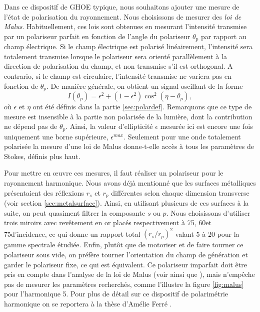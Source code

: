 Dans ce dispositif de GHOE typique, nous souhaitons ajouter une mesure de l'état de polarisation du rayonnement. Nous choisissons de mesurer des \textit{loi de Malus}. Habituellement, ces lois sont obtenues en mesurant l'intensité transmise par un polariseur parfait en fonction de l'angle du polariseur $\theta_p$ par rapport au champ électrique. Si le champ électrique est polarisé linéairement, l'intensité sera totalement transmise lorsque le polariseur sera orienté parallèlement à la direction de polarisation du champ, et non transmise s'il est orthogonal. A contrario, si le champ est circulaire, l'intensité transmise ne variera pas en fonction de $\theta_p$. De manière générale, on obtient un signal oscillant de la forme 
\begin{equation}
I(\theta_p) = \epsilon^2+(1-\epsilon^2)\cos^2(\eta-\theta_p),
\end{equation}
où $\epsilon$ et $\eta$ ont été définis dans la partie \ref{sec:polardef}. Remarquons que ce type de mesure est insensible à la partie non polarisée de la lumière, dont la contribution ne dépend pas de $\theta_p$. Ainsi, la valeur d'ellipticité $\epsilon$ mesurée ici est encore une fois uniquement une borne supérieure, $\epsilon^{max}$. Seulement pour une onde totalement polarisée la mesure d'une loi de Malus donne-t-elle accès à tous les paramètres de Stokes, définis plus haut. 

Pour mettre en œuvre ces mesures, il faut réaliser un polariseur pour le rayonnement harmonique. Nous avons déjà mentionné que les surfaces métalliques présentaient des réflexions $r_s$ et $r_p$ différentes selon chaque dimension transverse (voir section \ref{sec:metalsurface}). Ainsi, en utilisant plusieurs de ces surfaces à la suite, on peut quasiment filtrer la composante $s$ ou $p$. Nous choisissons d'utiliser trois miroirs avec revêtement en or placés respectivement à 75\degres, 60\degres et 75\degres d'incidence, ce qui donne un rapport total $(r_s/r_p)^2$ valant 5 à 20 pour la gamme spectrale étudiée. Enfin, plutôt que de motoriser et de faire tourner ce polariseur sous vide, on préfère tourner l'orientation du champ de génération et garder le polariseur fixe, ce qui est équivalent. Ce polariseur imparfait doit être pris en compte dans l'analyse de la loi de Malus (voir  ainsi que ), mais n'empêche pas de mesurer les paramètres recherchés, comme l'illustre la figure \ref{fig:malus} pour l'harmonique 5. Pour plus de détail sur ce dispositif de polarimétrie harmonique on se reportera à la thèse d'Amélie Ferré .

